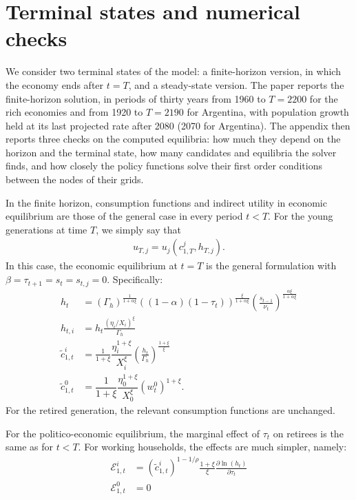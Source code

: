 \FloatBarrier
\section{Terminal states and numerical checks}\label{app:T}\setcounter{equation}{0}
We consider two terminal states of the model: a finite-horizon version, in which the economy ends after $t=T$, and a steady-state version. The paper reports the finite-horizon solution, in periods of thirty years from 1960 to $T = 2200$ for the rich economies and from 1920 to $T = 2190$ for Argentina, with population growth held at its last projected rate after 2080 (2070 for Argentina). The appendix then reports three checks on the computed equilibria: how much they depend on the horizon and the terminal state, how many candidates and equilibria the solver finds, and how closely the policy functions solve their first order conditions between the nodes of their grids.

In the finite horizon, consumption functions and indirect utility in economic equilibrium are those of the general case in every period $t<T$. For the young generations at time $T$, we simply say that
\begin{align*}
    u_{T, j} = u_j\left(c_{1,T}^j, h_{T,j}\right).
\end{align*}
In this case, the economic equilibrium at $t = T$ is the general formulation with $\beta = \tau_{t+1} = s_t = s_{t,j}= 0$. Specifically:
\begin{align}
    h_t &= \left(\Gamma_{h}\right)^{\frac{1}{1+\alpha\xi}}\left((1-\alpha)(1-\tau_t)\right)^{\frac{\xi}{1+\alpha\xi}}\left(\frac{s_{t-1}}{\nu_t}\right)^{\frac{\alpha\xi}{1+\alpha\xi}} \\
    h_{t,i} &= h_t\frac{(\eta_{i}/X_{i})^{\xi}}{\Gamma_{h}} \\
    \tilde{c}_{1,t}^i &= \frac{1}{1+\xi}\dfrac{\eta_{i}^{1+\xi}}{X_{i}^{\xi}}\left(\frac{h_t}{\Gamma_{h}}\right)^{\frac{1+\xi}{\xi}}  \\
    \tilde{c}_{1,t}^0 &= \dfrac{1}{1+\xi}\dfrac{\eta_{0}^{1+\xi}}{X_{0}^{\xi}}\left(w_t^0\right)^{1+\xi}.
\end{align}
For the retired generation, the relevant consumption functions are unchanged.

For the politico-economic equilibrium, the marginal effect of $\tau_t$ on retirees is the same as for $t<T$. For working households, the effects are much simpler, namely:
\begin{align}
    \mathcal{E}_{1,t}^i &= \left(\tilde{c}_{1,t}^i\right)^{1-1/\rho} \frac{1+\xi}{\xi} \frac{\partial \ln\left(h_t\right)}{\partial \tau_t} \\
    \mathcal{E}_{1,t}^0 &= 0
\end{align}


